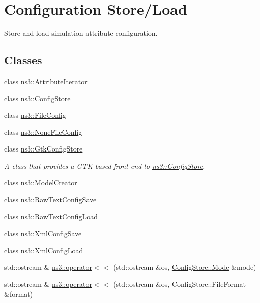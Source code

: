 \hypertarget{group__configstore}{}\section{Configuration Store/\+Load}
\label{group__configstore}


Store and load simulation attribute configuration.  


\subsection*{Classes}
\begin{DoxyCompactItemize}
\item 
class \hyperlink{classns3_1_1AttributeIterator}{ns3\+::\+Attribute\+Iterator}
\item 
class \hyperlink{classns3_1_1ConfigStore}{ns3\+::\+Config\+Store}
\item 
class \hyperlink{classns3_1_1FileConfig}{ns3\+::\+File\+Config}
\item 
class \hyperlink{classns3_1_1NoneFileConfig}{ns3\+::\+None\+File\+Config}
\item 
class \hyperlink{classns3_1_1GtkConfigStore}{ns3\+::\+Gtk\+Config\+Store}
\begin{DoxyCompactList}\small\item\em A class that provides a G\+T\+K-\/based front end to \hyperlink{classns3_1_1ConfigStore}{ns3\+::\+Config\+Store}. \end{DoxyCompactList}\item 
class \hyperlink{classns3_1_1ModelCreator}{ns3\+::\+Model\+Creator}
\item 
class \hyperlink{classns3_1_1RawTextConfigSave}{ns3\+::\+Raw\+Text\+Config\+Save}
\item 
class \hyperlink{classns3_1_1RawTextConfigLoad}{ns3\+::\+Raw\+Text\+Config\+Load}
\item 
class \hyperlink{classns3_1_1XmlConfigSave}{ns3\+::\+Xml\+Config\+Save}
\item 
class \hyperlink{classns3_1_1XmlConfigLoad}{ns3\+::\+Xml\+Config\+Load}
\end{DoxyCompactItemize}
\begin{DoxyCompactItemize}
\item 
std\+::ostream \& \hyperlink{group__configstore_ga289c47e33b83129aced7736ba7c7960a}{ns3\+::operator$<$$<$} (std\+::ostream \&os, \hyperlink{lte__uplink__power__control_8m_a21de820aff859dc731034b432a16fa96}{Config\+Store\+::\+Mode} \&mode)
\item 
std\+::ostream \& \hyperlink{group__configstore_ga54d3ccba7f4a9b747b2d0c61b4e3db95}{ns3\+::operator$<$$<$} (std\+::ostream \&os, Config\+Store\+::\+File\+Format \&format)
\end{DoxyCompactItemize}


